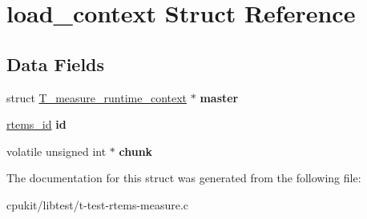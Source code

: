 \hypertarget{structload__context}{}\section{load\+\_\+context Struct Reference}
\label{structload__context}
\subsection*{Data Fields}
\begin{DoxyCompactItemize}
\item 
\mbox{\label{structload__context_aacc9e11ffd4cfb0d1fa0665fcbe2f63f}} 
struct \mbox{\hyperlink{structT__measure__runtime__context}{T\+\_\+measure\+\_\+runtime\+\_\+context}} $\ast$ {\bfseries master}
\item 
\mbox{\label{structload__context_aa65b1267c658a81b73c0e4fe42d2361c}} 
\mbox{\hyperlink{group__ClassicTasks_gab20892b814dced7dd4e5b9bf42becd57}{rtems\+\_\+id}} {\bfseries id}
\item 
\mbox{\label{structload__context_a3b1bcd4fd984bb5c097c02f370af2c58}} 
volatile unsigned int $\ast$ {\bfseries chunk}
\end{DoxyCompactItemize}


The documentation for this struct was generated from the following file\+:\begin{DoxyCompactItemize}
\item 
cpukit/libtest/t-\/test-\/rtems-\/measure.\+c\end{DoxyCompactItemize}
